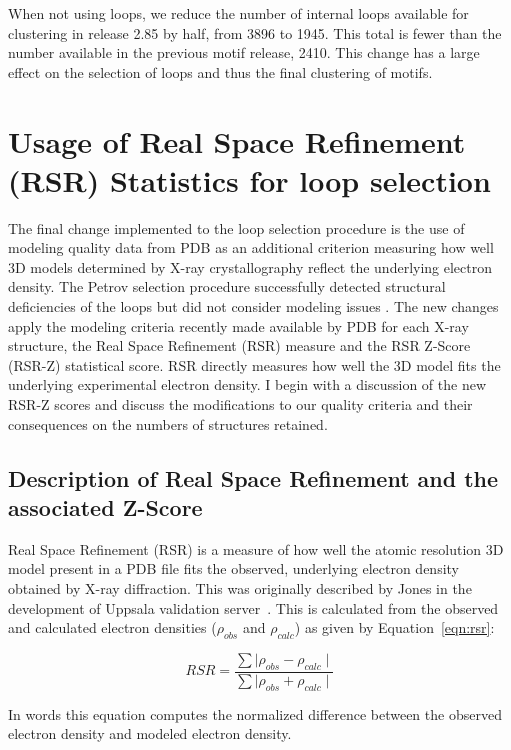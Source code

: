 When not using \cyem{} loops, we reduce the number of internal loops available
for clustering in release 2.85 by half, from 3896 to 1945. This total is fewer
than the number available in the previous motif release, 2410. This change has a
large effect on the selection of loops and thus the final clustering of motifs.

\section{Usage of Real Space Refinement (RSR) Statistics for loop selection}

The final change implemented to the loop selection procedure is the use of modeling
quality data from PDB as an additional criterion measuring how well 3D models
determined by X-ray crystallography reflect the underlying electron density. The
Petrov \etal{} selection procedure successfully detected structural
deficiencies of the loops but did not consider modeling issues
\cite{Petrov2012}. The new changes apply the modeling criteria recently made
available by PDB for each X-ray structure, the Real Space Refinement (RSR)
measure and the RSR Z-Score (RSR-Z) statistical score. RSR directly measures
how well the 3D model fits the underlying experimental electron density. I begin
with a discussion of the new RSR-Z scores and discuss the modifications to our
quality criteria and their consequences on the numbers of structures retained.

\subsection{Description of Real Space Refinement and the associated Z-Score}

Real Space Refinement (RSR) is a measure of how well the atomic resolution 3D
model present in a PDB file fits the observed, underlying electron density
obtained by X-ray diffraction. This was originally described by Jones \etal{} in
the development of Uppsala validation server~\cite{Kleywegt2004a}. This is
calculated from the observed and calculated electron densities ($\rho_{obs}$ and
$\rho_{calc}$) as given by Equation~\ref{eqn:rsr}:

\begin{equation}
  RSR = \frac{\sum \mid \rho_{obs} - \rho_{calc} \mid}
             {\sum \mid \rho_{obs} + \rho_{calc} \mid}
\label{eqn:rsr}
\end{equation}

In words this equation computes the normalized difference between the observed
electron density and modeled electron density. 

